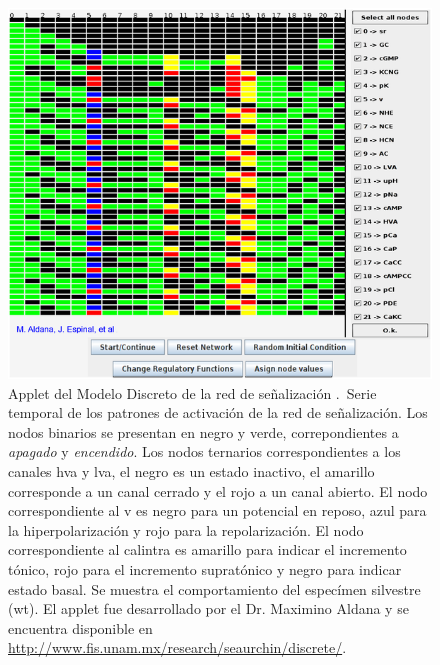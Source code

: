 \begin{figure}[hbt]
\includegraphics[width=0.9\linewidth%
]{gfx/appletErizo}
\caption[Applet del Modelo Discreto]{Applet del Modelo Discreto de la red de se\~nalizaci\'on \citeauthor{Espinal2011} \citep{Espinal2011}.\ Serie temporal de los patrones de activación de la red de señalización. Los nodos binarios se presentan en negro y verde, correpondientes a \emph{apagado} y \emph{encendido}. Los nodos ternarios correspondientes a los canales \ac{hva} y \ac{lva}, el negro es un estado inactivo, el amarillo corresponde a un canal cerrado y el rojo a un canal abierto. El nodo correspondiente al \acf{v} es negro para un potencial en reposo, azul para la hiperpolarización y rojo para la repolarización. El nodo correspondiente al \ac{calintra} es amarillo para indicar el incremento tónico, rojo para el incremento supratónico y negro para indicar estado basal. Se muestra el comportamiento del especímen silvestre (wt).
El applet fue desarrollado por el Dr. Maximino Aldana y se encuentra disponible en \url{http://www.fis.unam.mx/research/seaurchin/discrete/}.}\label{fig:appletErizo}
\end{figure}

